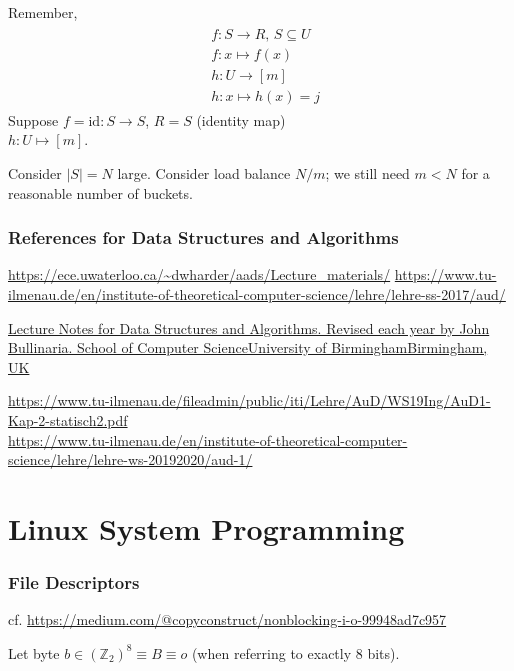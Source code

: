 \documentclass[10pt]{amsart}
\begin{document}
Remember,
\begin{equation}
\boxed{
	\begin{gathered}
	\begin{aligned}
	& f:S \to R, \, S \subseteq U \\ 
	& f:x \mapsto f(x) \\
	& h:U\to [m] \\ 
	& h:x \mapsto h(x) = j
	\end{aligned}
	\end{gathered} }
\end{equation}
Suppose $f= \text{id}: S \to S$, $R=S$ (identity map) \\
$h:U \mapsto [m] $.

Consider $|S| = N$ large. Consider load balance $N/m $; we still need $m < N$ for a reasonable number of buckets.


\section{References for Data Structures and Algorithms}

\url{https://ece.uwaterloo.ca/~dwharder/aads/Lecture_materials/}
\url{https://www.tu-ilmenau.de/en/institute-of-theoretical-computer-science/lehre/lehre-ss-2017/aud/}

\href{https://www.cs.bham.ac.uk/~jxb/DSA/dsa.pdf}{Lecture Notes for Data Structures and Algorithms. Revised each year by John Bullinaria. School of Computer ScienceUniversity of BirminghamBirmingham, UK}

\url{https://www.tu-ilmenau.de/fileadmin/public/iti/Lehre/AuD/WS19Ing/AuD1-Kap-2-statisch2.pdf} \\
\url{https://www.tu-ilmenau.de/en/institute-of-theoretical-computer-science/lehre/lehre-ws-20192020/aud-1/} \\


\part{Linux System Programming}

\section{File Descriptors}

cf. \url{https://medium.com/@copyconstruct/nonblocking-i-o-99948ad7c957}

Let byte $b \in (\mathbb{Z}_2)^8 \equiv B \equiv o$ (when referring to exactly 8 bits).
\end{document}
